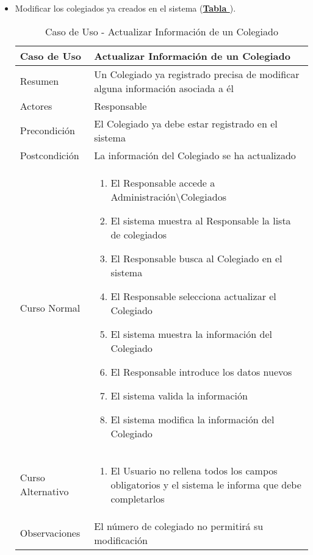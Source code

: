 \begin{itemize}
	\item \addtocounter{tabla}{1} Modificar los colegiados ya creados en el sistema (\textbf{\hyperref[tab:curActualizarColeg]{Tabla }}).
		\begin{table}[!htbp]
		  \centering \addtocounter{casouso}{1}
		  \begin{tabular}{|l | p{100mm}|}
		    \textbf{Caso de Uso}  & \textbf{Actualizar Información de un Colegiado} \\ \hline
		    Resumen 		 & Un Colegiado ya registrado precisa de modificar alguna información asociada a él \\ \hline
		    Actores  		 & Responsable \\ \hline
		    Precondición  	 & El Colegiado ya debe estar registrado en el sistema  \\ \hline
		    Postcondición  	 & La información del Colegiado se ha actualizado \\ \hline
		    Curso Normal   	 & \begin{enumerate}
			  \item El Responsable accede a Administración\textbackslash Colegiados
			  \item El sistema muestra al Responsable la lista de colegiados
			  \item El Responsable busca al Colegiado en el sistema
			  \item El Responsable selecciona actualizar el Colegiado
			  \item El sistema muestra la información del Colegiado
			  \item El Responsable introduce los datos nuevos
			  \item El sistema valida la información
			  \item El sistema modifica la información del Colegiado
		    \end{enumerate}  \\ \hline
		    Curso Alternativo  & \begin{enumerate}
			  \item El Usuario no rellena todos los campos obligatorios y el sistema le informa que debe completarlos
		    \end{enumerate}  \\ \hline
		    Observaciones 	 & El número de colegiado no permitirá su modificación  \\ \hline
		  \end{tabular}
		  \caption{Caso de Uso  - Actualizar Información de un Colegiado}
		  \label{tab:curActualizarColeg}
		\end{table}
		\FloatBarrier
\end{itemize}

